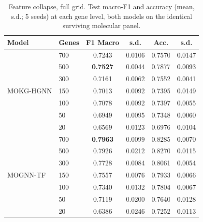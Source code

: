 \documentclass[10pt]{article}
\begin{document}
\begin{table}[h]
\centering
\caption{Feature collapse, full grid. Test macro-F1 and accuracy (mean, s.d.;
5 seeds) at each gene level, both models on the identical surviving molecular
panel.}
\label{tab:s_collapse}
\small
\setlength{\tabcolsep}{7pt}
\begin{tabular}{llcccc}
\toprule
\textbf{Model} & \textbf{Genes} & \textbf{F1 Macro} & \textbf{s.d.} & \textbf{Acc.} & \textbf{s.d.} \\
\midrule
\multirow{7}{*}{MOKG-HGNN}
 & 700 & 0.7243 & 0.0106 & 0.7570 & 0.0147 \\
 & 500 & \textbf{0.7527} & 0.0044 & 0.7877 & 0.0093 \\
 & 300 & 0.7161 & 0.0062 & 0.7552 & 0.0041 \\
 & 150 & 0.7013 & 0.0092 & 0.7395 & 0.0149 \\
 & 100 & 0.7078 & 0.0092 & 0.7397 & 0.0055 \\
 & 50  & 0.6949 & 0.0095 & 0.7348 & 0.0060 \\
 & 20  & 0.6569 & 0.0123 & 0.6976 & 0.0104 \\
\midrule
\multirow{7}{*}{MOGNN-TF}
 & 700 & \textbf{0.7963} & 0.0099 & 0.8285 & 0.0070 \\
 & 500 & 0.7926 & 0.0212 & 0.8270 & 0.0115 \\
 & 300 & 0.7728 & 0.0084 & 0.8061 & 0.0054 \\
 & 150 & 0.7557 & 0.0076 & 0.7933 & 0.0066 \\
 & 100 & 0.7340 & 0.0132 & 0.7804 & 0.0067 \\
 & 50  & 0.7119 & 0.0200 & 0.7640 & 0.0128 \\
 & 20  & 0.6386 & 0.0246 & 0.7252 & 0.0113 \\
\bottomrule
\end{tabular}
\end{table}
\end{document}
